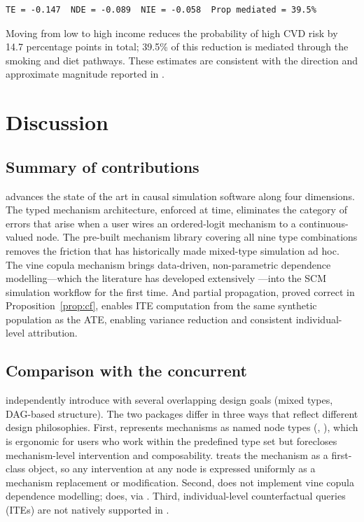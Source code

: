 \documentclass[article]{jss}
\begin{document}
\begin{tcolorbox}[outputbox, title={\small Output}]
\begin{verbatim}
TE = -0.147  NDE = -0.089  NIE = -0.058  Prop mediated = 39.5%
\end{verbatim}
\end{tcolorbox}

Moving from low to high income reduces the probability of high CVD risk by 14.7
percentage points in total; 39.5\% of this reduction is mediated through the
smoking and diet pathways. These estimates are consistent with the direction and
approximate magnitude reported in \citet{vanderweele2015explanation}.

\section{Discussion}
\label{sec:discussion}

\subsection{Summary of contributions}

 advances the state of the art in causal simulation software
along four dimensions. The typed mechanism architecture, enforced at
 time, eliminates the category of errors that arise when a
user wires an ordered-logit mechanism to a continuous-valued node. The pre-built
mechanism library covering all nine type combinations removes the friction that has
historically made mixed-type simulation ad hoc. The vine copula mechanism brings
data-driven, non-parametric dependence modelling---which the literature has
developed extensively \citep{czado2019analyzing, nagler2022rvinecopulib}---into the
SCM simulation workflow for the first time. And partial propagation, proved correct
in Proposition~\ref{prop:cf}, enables ITE computation from the same synthetic
population as the ATE, enabling variance reduction and consistent individual-level
attribution.

\subsection{Comparison with the concurrent }

\citet{denz2026simdag} independently introduce  with several
overlapping design goals (mixed types, DAG-based structure). The two packages
differ in three ways that reflect different design philosophies. First,
 represents mechanisms as named node types (,
), which is ergonomic for users who work within the
predefined type set but forecloses mechanism-level intervention and composability.
 treats the mechanism as a first-class object, so any
intervention at any node is expressed uniformly as a mechanism replacement or
modification. Second,  does not implement vine copula dependence
modelling;  does, via . Third, individual-level
counterfactual queries (ITEs) are not natively supported in .
\end{document}
